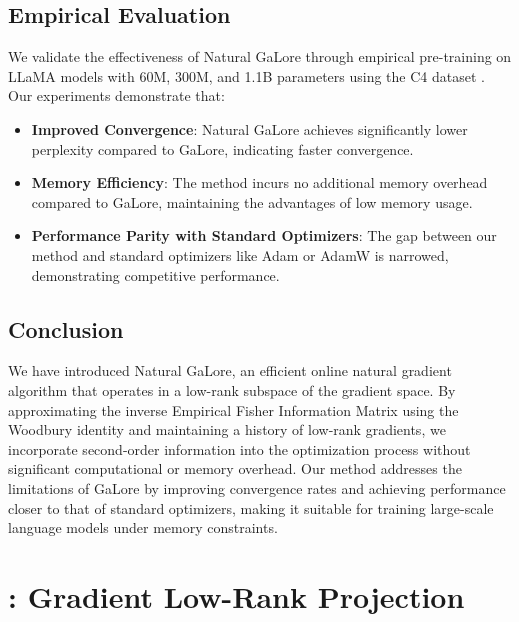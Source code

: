 \subsection{Empirical Evaluation}

We validate the effectiveness of Natural GaLore through empirical pre-training on LLaMA models with 60M, 300M, and 1.1B parameters using the C4 dataset \citep{raffelExploringLimitsTransfer2020}. Our experiments demonstrate that:

\begin{itemize}
    \item \textbf{Improved Convergence}: Natural GaLore achieves significantly lower perplexity compared to GaLore, indicating faster convergence.
    \item \textbf{Memory Efficiency}: The method incurs no additional memory overhead compared to GaLore, maintaining the advantages of low memory usage.
    \item \textbf{Performance Parity with Standard Optimizers}: The gap between our method and standard optimizers like Adam or AdamW is narrowed, demonstrating competitive performance.
\end{itemize}

\subsection{Conclusion}

We have introduced Natural GaLore, an efficient online natural gradient algorithm that operates in a low-rank subspace of the gradient space. By approximating the inverse Empirical Fisher Information Matrix using the Woodbury identity and maintaining a history of low-rank gradients, we incorporate second-order information into the optimization process without significant computational or memory overhead. Our method addresses the limitations of GaLore by improving convergence rates and achieving performance closer to that of standard optimizers, making it suitable for training large-scale language models under memory constraints.


\section{\lowrank: Gradient Low-Rank Projection}
